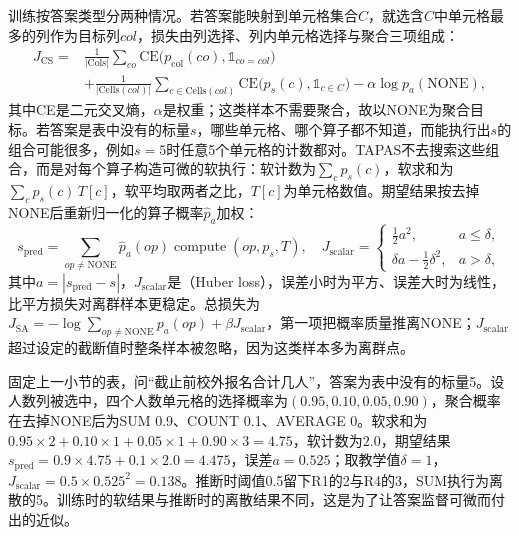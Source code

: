 训练按答案类型分两种情况。若答案能映射到单元格集合$C$，就选含$C$中单元格最多的列作为目标列$\mathit{col}$，损失由列选择、列内单元格选择与聚合三项组成：
\begin{equation}
\begin{aligned}
  J_{\mathrm{CS}}={}&
  \frac{1}{|\mathrm{Cols}|}\sum_{\mathit{co}}\mathrm{CE}\bigl(p_{\mathrm{col}}(\mathit{co}),\mathbb 1_{\mathit{co}=\mathit{col}}\bigr)\\
  &+\frac{1}{|\mathrm{Cells}(\mathit{col})|}\sum_{c\in\mathrm{Cells}(\mathit{col})}\mathrm{CE}\bigl(p_s(c),\mathbb 1_{c\in C}\bigr)
  -\alpha\log p_a(\text{NONE}),
\end{aligned}
  \label{eq:nlp-dialogue-tapas-cs}
\end{equation}
其中CE是二元交叉熵，$\alpha$是权重；这类样本不需要聚合，故以NONE为聚合目标。若答案是表中没有的标量$s$，哪些单元格、哪个算子都不知道，而能执行出$s$的组合可能很多，例如$s=5$时任意5个单元格的计数都对。TAPAS不去搜索这些组合，而是对每个算子构造可微的软执行：软计数为$\sum_c p_s(c)$，软求和为$\sum_c p_s(c)\,T[c]$，软平均取两者之比，$T[c]$为单元格数值。期望结果按去掉NONE后重新归一化的算子概率$\hat p_a$加权：
\begin{equation}
  s_{\mathrm{pred}}=\sum_{\mathit{op}\neq\text{NONE}}\hat p_a(\mathit{op})\operatorname{compute}(\mathit{op},p_s,T),\quad
  J_{\mathrm{scalar}}=
  \begin{cases}
    \tfrac12 a^2, & a\leq\delta,\\
    \delta a-\tfrac12\delta^2, & a>\delta,
  \end{cases}
  \label{eq:nlp-dialogue-tapas-scalar}
\end{equation}
其中$a=|s_{\mathrm{pred}}-s|$，$J_{\mathrm{scalar}}$是（Huber loss），误差小时为平方、误差大时为线性，比平方损失对离群样本更稳定。总损失为$J_{\mathrm{SA}}=-\log\sum_{\mathit{op}\neq\text{NONE}}p_a(\mathit{op})+\beta J_{\mathrm{scalar}}$，第一项把概率质量推离NONE；$J_{\mathrm{scalar}}$超过设定的截断值时整条样本被忽略，因为这类样本多为离群点。

固定上一小节的表，问“截止前校外报名合计几人”，答案为表中没有的标量5。设人数列被选中，四个人数单元格的选择概率为$(0.95,0.10,0.05,0.90)$，聚合概率在去掉NONE后为SUM 0.9、COUNT 0.1、AVERAGE 0。软求和为$0.95\times2+0.10\times1+0.05\times1+0.90\times3=4.75$，软计数为$2.0$，期望结果$s_{\mathrm{pred}}=0.9\times4.75+0.1\times2.0=4.475$，误差$a=0.525$；取教学值$\delta=1$，$J_{\mathrm{scalar}}=0.5\times0.525^2=0.138$。推断时阈值0.5留下R1的2与R4的3，SUM执行为离散的5。训练时的软结果与推断时的离散结果不同，这是为了让答案监督可微而付出的近似。

